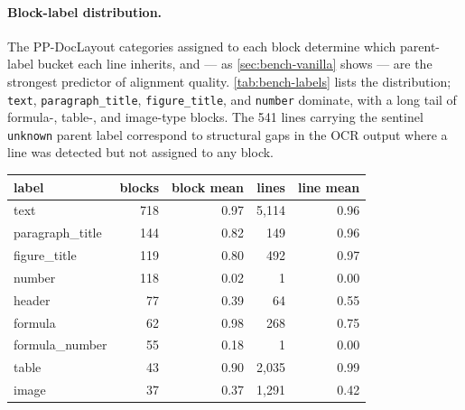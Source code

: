 \documentclass{article}
\theoremstyle{definition}
\begin{document}
\paragraph{Block-label distribution.}
The PP-DocLayout categories assigned to each block determine which
parent-label bucket each line inherits, and --- as \cref{sec:bench-vanilla}
shows --- are the strongest predictor of alignment quality.
\cref{tab:bench-labels} lists the distribution; \texttt{text},
\texttt{paragraph\_title}, \texttt{figure\_title}, and \texttt{number}
dominate, with a long tail of formula-, table-, and image-type blocks.
The 541 lines carrying the sentinel \texttt{unknown} parent label
correspond to structural gaps in the OCR output where a line was
detected but not assigned to any block.

\begin{table}[h]
      \centering
      \small
      \begin{tabular}{lrrrr}
            \toprule
            \textbf{label}                & \textbf{blocks} & \textbf{block mean} & \textbf{lines} & \textbf{line mean} \\
            \midrule
            text                          & 718             & 0.97                & 5{,}114        & 0.96               \\
            paragraph\_title              & 144             & 0.82                & 149            & 0.96               \\
            figure\_title                 & 119             & 0.80                & 492            & 0.97               \\
            number                        & 118             & 0.02                & 1              & 0.00               \\
            header                        & 77              & 0.39                & 64             & 0.55               \\
            formula                       & 62              & 0.98                & 268            & 0.75               \\
            formula\_number               & 55              & 0.18                & 1              & 0.00               \\
            table                         & 43              & 0.90                & 2{,}035        & 0.99               \\
            image                         & 37              & 0.37                & 1{,}291        & 0.42               \\

\end{tabular}
\end{table}
\end{document}
